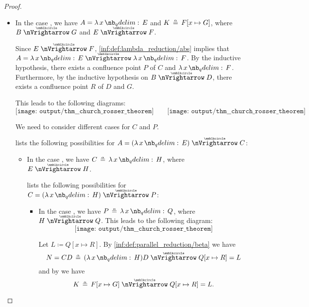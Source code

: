 \begin{proof}
\begin{itemize}
\begin{itemize}
      \item In the case , we have \( A = \qabs x E \) and \( K \aequiv F[x \mapsto G] \), where \( B \ppred G \) and \( E \ppred F \).

      Since \( E \ppred F \), \ref{inf:def:lambda_reduction/abs} implies that \( A = \qabs x E \ppred \qabs x F \). By the inductive hypothesis, there exists a confluence point \( P \) of \( C \) and \( \qabs x F \). Furthermore, by the inductive hypothesis on \( B \ppred D \), there exists a confluence point \( R \) of \( D \) and \( G \).

      This leads to the following diagrams:
      \begin{equation*}
        \texttt{[image: output/thm\_\_church\_rosser\_theorem]}
        \quad\quad
        \texttt{[image: output/thm\_\_church\_rosser\_theorem]}
      \end{equation*}

      We need to consider different cases for \( C \) and \( P \).

       lists the following possibilities for \( A = (\qabs x E) \ppred C \):
      \begin{itemize}
        \item In the case , we have \( C \aequiv \qabs x H \), where \( E \ppred H \).

         lists the following possibilities for \( C = (\qabs x H) \ppred P \):
        \begin{itemize}
          \item In the case , we have \( P \aequiv \qabs x Q \), where \( H \ppred Q \). This leads to the following diagram:
          \begin{equation*}
            \texttt{[image: output/thm\_\_church\_rosser\_theorem]}
          \end{equation*}

          Let \( L \coloneqq Q[x \mapsto R] \). By \ref{inf:def:parallel_reduction/beta} we have
          \begin{equation*}
            N = CD \aequiv (\qabs x H) D \ppred Q[x \mapsto R] = L
          \end{equation*}
          and by  we have
          \begin{equation*}
            K \aequiv F[x \mapsto G] \ppred Q[x \mapsto R] = L.
          \end{equation*}


\end{itemize}
\end{itemize}
\end{itemize}
\end{itemize}
\end{proof}
